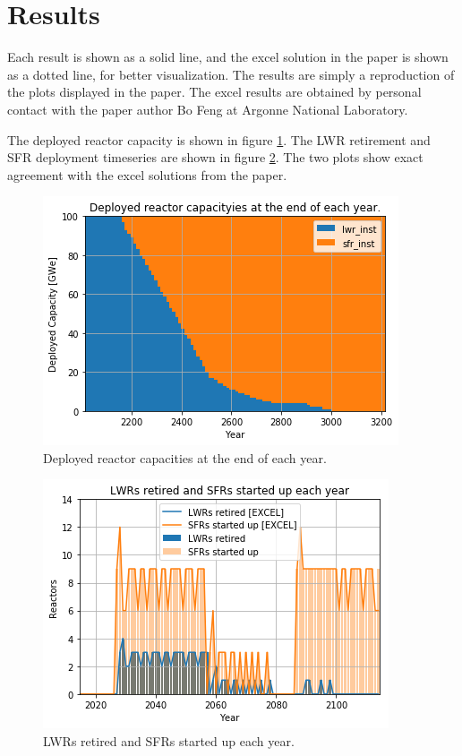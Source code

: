 \section{Results}

Each \Cyclus result is shown as a solid line, and the excel solution in the
paper is shown as a dotted line, for better visualization. The results are
simply a reproduction of the plots displayed in the paper. The excel
results are obtained by personal contact with the paper author
Bo Feng at Argonne National Laboratory.

The deployed reactor capacity is shown in figure \ref{fig:pow_plot}.
The \gls{LWR} retirement and \gls{SFR} deployment timeseries are shown
in figure \ref{fig:dep}. The two plots show exact agreement with the
excel solutions from the paper.

\begin{figure}[htbp!]
	\begin{center}
		\includegraphics[scale=0.6]{./images/results_18/power_plot.png}
	\end{center}
        \caption{Deployed reactor capacities at the end of each year.}
	\label{fig:pow_plot}
\end{figure}



\begin{figure}[htbp!]
	\begin{center}
		\includegraphics[scale=0.6]{./images/results_18/dep.png}
	\end{center}
        \caption{\glspl{LWR} retired and \glspl{SFR} started up each year.}
	\label{fig:dep}
\end{figure}


